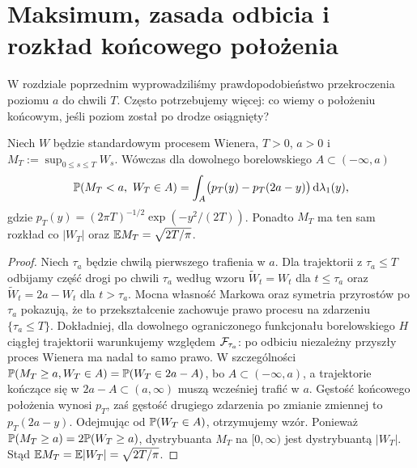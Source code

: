 \section{Maksimum, zasada odbicia i rozkład końcowego położenia}
W rozdziale poprzednim wyprowadziliśmy prawdopodobieństwo
przekroczenia poziomu $a$ do chwili $T$. Często potrzebujemy
więcej: co wiemy o położeniu końcowym, jeśli poziom został
po drodze osiągnięty?

\begin{twierdzenie}
Niech $W$ będzie standardowym procesem Wienera,
$T>0$, $a>0$ i $M_T:=\sup_{0\le s\le T}W_s$.
Wówczas dla dowolnego borelowskiego $A\subset(-\infty,a)$
\[
\mathbb{P}(M_T<a,\ W_T\in A)
=\int_A\bigl(p_T(y)-p_T(2a-y)\bigr)\,\mathrm{d}\lambda_1(y),
\]
gdzie $p_T(y)=(2\pi T)^{-1/2}\exp(-y^2/(2T))$.
Ponadto $M_T$ ma ten sam rozkład co $|W_T|$ oraz
$\mathbb{E} M_T=\sqrt{2T/\pi}$.
\end{twierdzenie}
\begin{proof}
Niech $\tau_a$ będzie chwilą pierwszego trafienia w $a$.
Dla trajektorii z $\tau_a\le T$ odbijamy część drogi
po chwili $\tau_a$ według wzoru
$\widetilde W_t=W_t$ dla $t\le\tau_a$ oraz
$\widetilde W_t=2a-W_t$ dla $t>\tau_a$.
Mocna własność Markowa oraz symetria przyrostów po
$\tau_a$ pokazują, że to przekształcenie zachowuje prawo
procesu na zdarzeniu $\{\tau_a\le T\}$. Dokładniej,
dla dowolnego ograniczonego funkcjonału borelowskiego
$H$ ciągłej trajektorii warunkujemy względem $\mathcal{F}_{\tau_a}$:
po odbiciu niezależny przyszły proces Wienera ma nadal to samo prawo.
W szczególności
$\mathbb{P}(M_T\ge a,W_T\in A)=\mathbb{P}(W_T\in 2a-A)$,
bo $A\subset(-\infty,a)$, a trajektorie kończące się
w $2a-A\subset(a,\infty)$ muszą wcześniej trafić w $a$.
Gęstość końcowego położenia wynosi $p_T$, zaś gęstość
drugiego zdarzenia po zmianie zmiennej to $p_T(2a-y)$.
Odejmując od $\mathbb{P}(W_T\in A)$, otrzymujemy wzór.
Ponieważ $\mathbb{P}(M_T\ge a)=2\mathbb{P}(W_T\ge a)$,
dystrybuanta $M_T$ na $[0,\infty)$ jest dystrybuantą
$|W_T|$. Stąd
$\mathbb{E} M_T=\mathbb{E}|W_T|=\sqrt{2T/\pi}$.
\end{proof}

